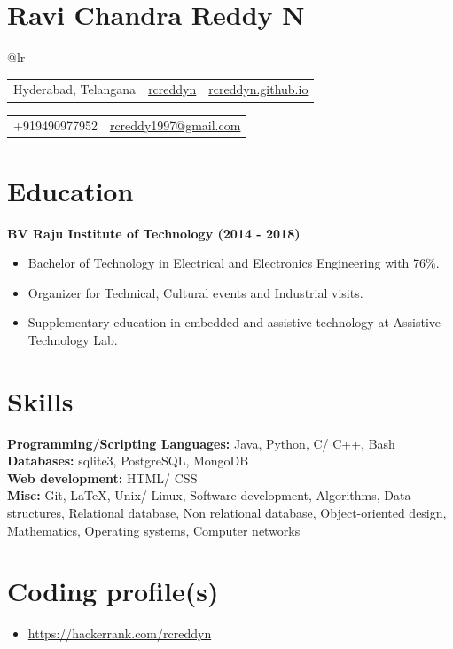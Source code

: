 \documentclass{article}
\begin{document}
\section*{\Huge Ravi Chandra Reddy N}
\begin{tabular}{@{}lr}
\begin{tabular}{@{}lcr}
\faIcon{map-marker-alt} {Hyderabad, Telangana} & \faIcon{linkedin} \href{https://linkedin.com/in/rcreddyn}{rcreddyn} & \faIcon{globe} \href{https://rcreddyn.github.io}{rcreddyn.github.io}\\
\end{tabular}
\begin{tabular}{@{}lr}
\faIcon{phone} +919490977952 & \faIcon{envelope} \href{mailto:rcreddy1997@gmail.com}{rcreddy1997@gmail.com}\\
\end{tabular}
\end{tabular}

\section*{Education}
 \textbf{BV Raju Institute of Technology (2014 - 2018)}
\begin{itemize}
\item \small Bachelor of Technology in Electrical and Electronics Engineering with 76\%.
\item \small Organizer for Technical, Cultural events and Industrial visits.
\item \small Supplementary education in embedded and assistive technology at Assistive Technology Lab.
\end{itemize}

\section*{Skills}
\small\textbf{Programming/Scripting Languages:} Java, Python, C/ C++, Bash \\
\small\textbf{Databases:} sqlite3, PostgreSQL, MongoDB \\
\small\textbf{Web development:} HTML/ CSS \\
\small\textbf{Misc:} Git, \LaTeX, Unix/ Linux, Software development, Algorithms, Data structures, Relational database, Non relational database, Object-oriented design, Mathematics, Operating systems, Computer networks

\section*{Coding profile(s)}
\begin{itemize}
\item \url {https://hackerrank.com/rcreddyn}
\end{itemize}
\end{document}
